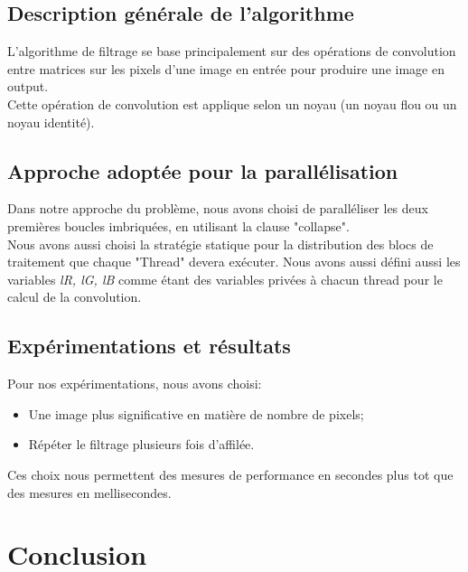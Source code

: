\documentclass{report}
\begin{document}
\section{Description générale de l'algorithme}
L'algorithme de filtrage se base principalement sur des opérations de convolution entre matrices
 sur les pixels d'une image en entrée pour produire une image en output.\\
Cette opération de convolution est applique selon un noyau (un noyau flou ou un noyau identité).
\section{Approche adoptée pour la parallélisation }
Dans notre approche du problème, nous avons choisi de paralléliser les deux premières
boucles imbriquées, en utilisant la clause "collapse".\\
Nous avons aussi choisi la stratégie statique pour la distribution des blocs de traitement
que chaque "Thread" devera exécuter. Nous avons aussi défini aussi les variables \textit{lR, lG, lB}
comme étant des variables privées à chacun thread pour le calcul de la convolution.
\section{Expérimentations et résultats}
Pour nos expérimentations, nous avons choisi:
\begin{itemize}
	\item Une image plus significative en matière de nombre de pixels;
	\item Répéter le filtrage plusieurs fois d'affilée.
\end{itemize}
Ces choix nous permettent des mesures de performance en secondes plus
tot que des mesures en mellisecondes.

\chapter{Conclusion}
\end{document}
